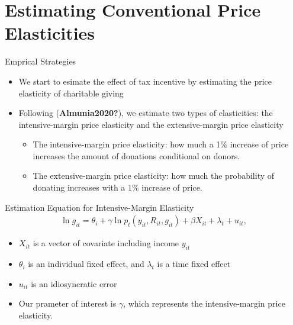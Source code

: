 \documentclass[
  ignorenonframetext,
  aspectratio=169,
]{beamer}
\providecommand{\tightlist}{%
  \setlength{\itemsep}{0pt}\setlength{\parskip}{0pt}}
\begin{document}
\hypertarget{estimating-conventional-price-elasticities}{%
\section{Estimating Conventional Price Elasticities}\label{estimating-conventional-price-elasticities}}

\begin{frame}{Emprical Strategies}
\protect\hypertarget{emprical-strategies}{}
\begin{itemize}
\tightlist
\item
  We start to esimate the effect of tax incentive by estimating the price elasticity of charitable giving
\item
  Following (\textbf{Almunia2020?}), we estimate two types of elasticities: the intensive-margin price elasticity and the extensive-margin price elasticity

  \begin{itemize}
  \tightlist
  \item
    The intensive-margin price elasticity: how much a 1\% increase of price increases the amount of donations conditional on donors.
  \item
    The extensive-margin price elasticity: how much the probability of donating increases with a 1\% increase of price.
  \end{itemize}
\end{itemize}
\end{frame}

\begin{frame}{Estimation Equation for Intensive-Margin Elasticity}
\protect\hypertarget{estimation-equation-for-intensive-margin-elasticity}{}
\begin{align}
  \ln g_{it} = \theta_i + \gamma \ln p_t(y_{it}, R_{it}, g_{it})
  + \beta X_{it} + \lambda_t + u_{it}, \label{eq:intensive}
\end{align}

\begin{itemize}
\tightlist
\item
  \(X_{it}\) is a vector of covariate including income \(y_{it}\)
\item
  \(\theta_i\) is an individual fixed effect, and \(\lambda_t\) is a time fixed effect
\item
  \(u_{it}\) is an idiosyncratic error
\item
  Our prameter of interest is \(\gamma\), which represents the intensive-margin price elasticity.
\end{itemize}
\end{frame}
\end{document}
